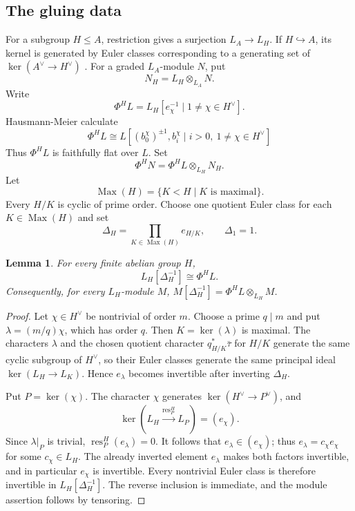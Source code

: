 \documentclass[11pt,reqno]{amsart}
\newtheorem{lemma}[lemma]{Lemma}
\newcommand{\res}{\operatorname{res}}
\newcommand{\tensor}{\otimes}
\newcommand{\Max}{\operatorname{Max}}
\begin{document}
\subsection{The gluing data}
For a subgroup $H\leq A$, restriction gives a surjection $L_A\to L_H$.  If $H\hookrightarrow A$, its kernel is generated by Euler classes corresponding to a generating set of $\ker(A^\vee\to H^\vee)$ \cite[Lemma 2.21]{hausmann2023invariant}.  For a graded $L_A$-module $N$, put
\[
  N_H=L_H\tensor_{L_A}N.
\]
Write
\[
  \Phi^HL =L_H[e_\chi^{-1}\mid1\neq\chi\in H^\vee].
\]
Hausmann-Meier\cite[Proposition 2.25]{hausmann2023invariant} calculate
\[
  \Phi^H L \cong  L[(b_0^\chi)^{\pm1},b_i^\chi\mid i>0,\ 1\neq\chi\in H^\vee]
\]
Thus $\Phi^H L$ is faithfully flat over $L$.  Set
\[
  \Phi^H N=\Phi^H L \otimes_{L_H} N_H.
\]
Let
\[
  \Max(H)=\{K < H\mid K\text{ is maximal}\}.
\]
Every $H/K$ is cyclic of prime order.  Choose one quotient Euler class for each $K\in\Max(H)$ and set
\[
  \Delta_H=\prod_{K\in\Max(H)}e_{H/K}, \qquad \Delta_1=1.
\]

\begin{lemma}\label{lem:maximal-euler-suffices}
For every finite abelian group $H$,
\[
 L_H[\Delta_H^{-1}]\cong \Phi^HL.
\]
Consequently, for every $L_H$-module $M$, $M[\Delta_H^{-1}]= \Phi^H L \tensor_{L_H} M$.
\end{lemma}

\begin{proof}
Let $\chi\in H^\vee$ be nontrivial of order $m$.  Choose a prime $q\mid m$ and put $\lambda=(m/q)\chi$, which has order $q$.  Then $K=\ker(\lambda)$ is maximal.  The characters $\lambda$ and the chosen quotient character $q_{H/K}^*\bar\tau$ for $H/K$ generate the same cyclic subgroup of $H^\vee$, so their Euler classes generate the same principal ideal $\ker(L_H\to L_K)$.  Hence $e_\lambda$ becomes invertible after inverting $\Delta_H$.

Put $P=\ker(\chi)$.  The character $\chi$ generates $\ker(H^\vee\to P^\vee)$, and
\[
  \ker(L_H\xrightarrow{\res_P^H}L_P)=(e_\chi).
\]
Since $\lambda|_P$ is trivial, $\res_P^H(e_\lambda)=0$.  It follows that $e_\lambda\in(e_\chi)$; thus $e_\lambda=c_\chi e_\chi$ for some $c_\chi\in L_H$.  The already inverted element $e_\lambda$ makes both factors invertible, and in particular $e_\chi$ is invertible.  Every nontrivial Euler class is therefore invertible in $L_H[\Delta_H^{-1}]$.  The reverse inclusion is immediate, and the module assertion follows by tensoring.
\end{proof}
\end{document}
